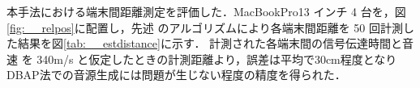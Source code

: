 本手法における端末間距離測定を評価した．MacBookPro13 インチ 4 台を，図\ref{fig:__relpos}に配置し，先述 のアルゴリズムにより各端末間距離を 50 回計測した結果を図\ref{tab:__estdistance}に示す．
計測された各端末間の信号伝達時間と音速 を 340m/s と仮定したときの計測距離より，誤差は平均で30cm程度となりDBAP法での音源生成には問題が生じない程度の精度を得られた．
